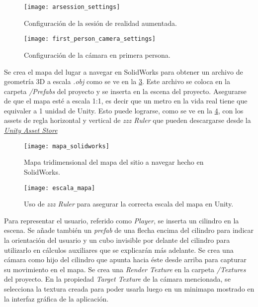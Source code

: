 \documentclass{article}
\newenvironment{standalone}{\begin{preview}}{\end{preview}}
\begin{document}
\begin{standalone}
\begin{figure}[ht!]
  \centering
  \texttt{[image: arsession\_settings]}
  \caption{Configuración de la sesión de realidad aumentada.}
  \label{fig:arsession_settings}
\end{figure}

\begin{figure}[ht!]
  \centering
  \texttt{[image: first\_person\_camera\_settings]}
  \caption{Configuración de la cámara en primera persona.}
  \label{fig:first_person_camera_settings}
\end{figure}

Se crea el mapa del lugar a navegar en SolidWorks para obtener un archivo de geometría 3D a escala \textit{.obj} como se ve en la \cref{fig:mapa_solidworks}.
Este archivo se coloca en la carpeta \textit{/Prefabs} del proyecto y se inserta en la escena del proyecto.
Asegurarse de que el mapa esté a escala 1:1, es decir que un metro en la vida real tiene que equivaler a 1 unidad de Unity.
Esto puede lograrse, como se ve en la \cref{fig:escala_mapa}, con los assets de regla horizontal y vertical de \textit{zzz Ruler} que pueden descargarse desde la \href{https://assetstore.unity.com/packages/tools/utilities/zz-ruler-365}{\textit{Unity Asset Store}}

\begin{figure}[ht!]
  \centering
  \texttt{[image: mapa\_solidworks]}
  \caption{Mapa tridimensional del mapa del sitio a navegar hecho en SolidWorks.}
  \label{fig:mapa_solidworks}
\end{figure}

\begin{figure}[ht!]
  \centering
  \texttt{[image: escala\_mapa]}
  \caption{Uso de \textit{zzz Ruler} para asegurar la correcta escala del mapa en Unity.}
  \label{fig:escala_mapa}
\end{figure}

Para representar el usuario, referido como \textit{Player}, se inserta un cilindro en la escena.
Se añade también un \textit{prefab} de una flecha encima del cilindro para indicar la orientación del usuario y un cubo invisible por delante del cilindro para utilizarlo en cálculos auxiliares que se explicarán más adelante.
Se crea una cámara como hijo del cilindro que apunta hacia éste desde arriba para capturar su movimiento en el mapa.
Se crea una \textit{Render Texture} en la carpeta \textit{/Textures} del proyecto.
En la propiedad \textit{Target Texture} de la cámara mencionada, se selecciona la textura creada para poder usarla luego en un minimapa mostrado en la interfaz gráfica de la aplicación.


\end{standalone}
\end{document}
